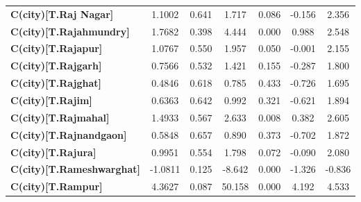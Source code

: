 \begin{center}
\begin{tabular}{lcccccc}
\textbf{C(city)[T.Raj Nagar]}                                                                       &       1.1002  &        0.641     &     1.717  &         0.086        &       -0.156    &        2.356     \\
\textbf{C(city)[T.Rajahmundry]}                                                                     &       1.7682  &        0.398     &     4.444  &         0.000        &        0.988    &        2.548     \\
\textbf{C(city)[T.Rajapur]}                                                                         &       1.0767  &        0.550     &     1.957  &         0.050        &       -0.001    &        2.155     \\
\textbf{C(city)[T.Rajgarh]}                                                                         &       0.7566  &        0.532     &     1.421  &         0.155        &       -0.287    &        1.800     \\
\textbf{C(city)[T.Rajghat]}                                                                         &       0.4846  &        0.618     &     0.785  &         0.433        &       -0.726    &        1.695     \\
\textbf{C(city)[T.Rajim]}                                                                           &       0.6363  &        0.642     &     0.992  &         0.321        &       -0.621    &        1.894     \\
\textbf{C(city)[T.Rajmahal]}                                                                        &       1.4933  &        0.567     &     2.633  &         0.008        &        0.382    &        2.605     \\
\textbf{C(city)[T.Rajnandgaon]}                                                                     &       0.5848  &        0.657     &     0.890  &         0.373        &       -0.702    &        1.872     \\
\textbf{C(city)[T.Rajura]}                                                                          &       0.9951  &        0.554     &     1.798  &         0.072        &       -0.090    &        2.080     \\
\textbf{C(city)[T.Rameshwarghat]}                                                                   &      -1.0811  &        0.125     &    -8.642  &         0.000        &       -1.326    &       -0.836     \\
\textbf{C(city)[T.Rampur]}                                                                          &       4.3627  &        0.087     &    50.158  &         0.000        &        4.192    &        4.533     \\

\end{tabular}
\end{center}
